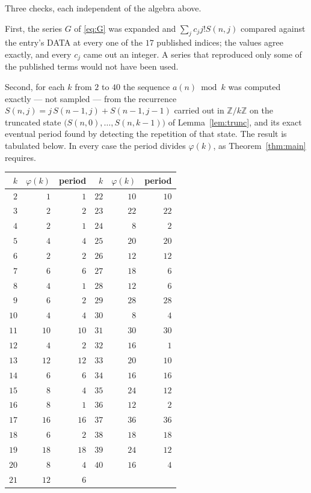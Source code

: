 \documentclass[11pt,a4paper]{article}
\theoremstyle{plain}
\theoremstyle{definition}
\begin{document}
Three checks, each independent of the algebra above.

First, the series $G$ of \eqref{eq:G} was expanded and $\sum_j c_j j! S(n,j)$ compared
against the entry's DATA at every one of the $17$ published indices; the values
agree exactly, and every $c_j$ came out an integer. A series that reproduced only some of
the published terms would not have been used.

Second, for each $k$ from $2$ to $40$ the sequence $a(n)\bmod k$ was computed exactly
--- not sampled --- from the recurrence $S(n,j)=j\,S(n-1,j)+S(n-1,j-1)$ carried out in
$\mathbb{Z}/k\mathbb{Z}$ on the truncated state
$\bigl(S(n,0),\dots,S(n,k-1)\bigr)$ of Lemma~\ref{lem:trunc}, and its exact eventual
period found by detecting the repetition of that state. The result is tabulated below.
In every case the period divides $\varphi(k)$, as Theorem~\ref{thm:main} requires.

\begin{center}\small
\begin{tabular}{rrr@{\qquad\qquad}rrr}
$k$ & $\varphi(k)$ & period & $k$ & $\varphi(k)$ & period \\ \hline
$2$ & $1$ & $1$ & $22$ & $10$ & $10$ \\
$3$ & $2$ & $2$ & $23$ & $22$ & $22$ \\
$4$ & $2$ & $1$ & $24$ & $8$ & $2$ \\
$5$ & $4$ & $4$ & $25$ & $20$ & $20$ \\
$6$ & $2$ & $2$ & $26$ & $12$ & $12$ \\
$7$ & $6$ & $6$ & $27$ & $18$ & $6$ \\
$8$ & $4$ & $1$ & $28$ & $12$ & $6$ \\
$9$ & $6$ & $2$ & $29$ & $28$ & $28$ \\
$10$ & $4$ & $4$ & $30$ & $8$ & $4$ \\
$11$ & $10$ & $10$ & $31$ & $30$ & $30$ \\
$12$ & $4$ & $2$ & $32$ & $16$ & $1$ \\
$13$ & $12$ & $12$ & $33$ & $20$ & $10$ \\
$14$ & $6$ & $6$ & $34$ & $16$ & $16$ \\
$15$ & $8$ & $4$ & $35$ & $24$ & $12$ \\
$16$ & $8$ & $1$ & $36$ & $12$ & $2$ \\
$17$ & $16$ & $16$ & $37$ & $36$ & $36$ \\
$18$ & $6$ & $2$ & $38$ & $18$ & $18$ \\
$19$ & $18$ & $18$ & $39$ & $24$ & $12$ \\
$20$ & $8$ & $4$ & $40$ & $16$ & $4$ \\
$21$ & $12$ & $6$ &  & & \\
\end{tabular}
\end{center}
\end{document}
